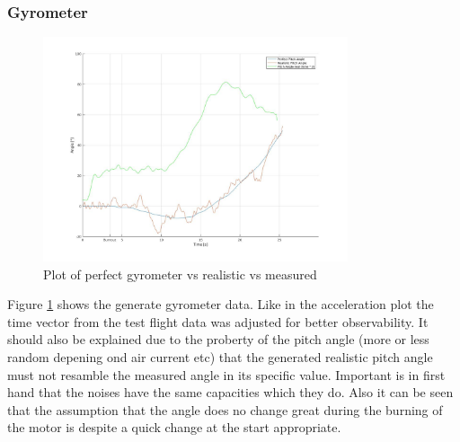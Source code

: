 \subsubsection{Gyrometer}
\begin{figure}[h!]
 \centering
 \includegraphics[width=0.8\textwidth]{./Pictures/PitchPerfVSReal.jpg}
 \caption{Plot of perfect gyrometer vs realistic vs measured}
 \label{fig:PtichPerVSReal}
\end{figure}
Figure \ref{fig:PtichPerVSReal} shows the generate gyrometer data.
Like in the acceleration plot the time vector from the test flight data was adjusted for better observability.
It should also be explained due to the proberty of the pitch angle (more or less random depening ond air current etc) that the generated realistic pitch angle must not resamble the measured angle in its specific value.
Important is in first hand that the noises have the same capacities which they do.
Also it can be seen that the assumption that the angle does no change great during the burning of the motor is despite a quick change at the start appropriate.

